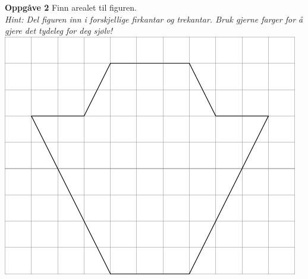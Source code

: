 \textbf{Oppgåve 2} \os
Finn arealet til figuren.\\
 \textit{\normalsize Hint: Del figuren inn i forskjellige firkantar og trekantar. Bruk gjerne farger for å gjere det tydeleg for deg sjølv!} \os
\includegraphics[]{o5} \vsk

\newpage

